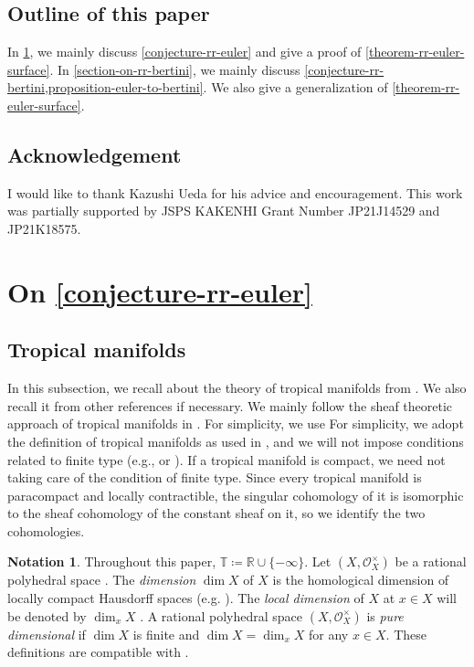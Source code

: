 \documentclass[a4paper,dvipdfmx,reqno,12pt]{amsart}
\theoremstyle{definition}
\newtheorem{notation}[theorem]{Notation}
\newcommand{\deq}{\coloneqq}
\numberwithin{equation}{section}
\begin{document}
\subsection{Outline of this paper}
In \cref{section-on-rr-euler}, we mainly
discuss \cref{conjecture-rr-euler} and
give a proof of \cref{theorem-rr-euler-surface}.
In \cref{section-on-rr-bertini}, we mainly
discuss \cref{conjecture-rr-bertini,proposition-euler-to-bertini}.
We also give a generalization of
\cref{theorem-rr-euler-surface}.

\subsection*{Acknowledgement}
I would like to thank Kazushi Ueda for his advice
and encouragement. This work was partially supported 
by JSPS KAKENHI Grant Number JP21J14529 and JP21K18575.

\section{On \cref{conjecture-rr-euler}}
\label{section-on-rr-euler}
\subsection{Tropical manifolds}
In this subsection, we recall about 
the theory of tropical manifolds from
\cite{shaw2011tropical,MR3330789,mikhalkin2018tropical,MR4637248,demedrano2023chern}.
We also recall it from other references if necessary.
We mainly follow the sheaf theoretic approach of
tropical manifolds in \cite{MR4637248}.
For simplicity, we use 
For simplicity, we adopt the definition of
tropical manifolds as used in \cite[Definition 6.1]{gross2019sheaftheoretic},
and we will not impose conditions related to finite type 
(e.g., \cite[Definition 7.1.14]{mikhalkin2018tropical} 
or \cite[Definition 2.3 (4)]{demedrano2023chern}).
If a tropical manifold is compact, we need not
taking care of the condition of finite type. 
Since every tropical manifold is paracompact and
locally contractible, the singular cohomology
of it is isomorphic to the sheaf cohomology
of the constant sheaf on it, so we identify
the two cohomologies.

\begin{notation}
Throughout this paper, $\mathbb{T}\deq 
\mathbb{R}\cup\{-\infty\}$.
Let $(X,\mathcal{O}_X^{\times})$ be a rational
polyhedral space \cite[Definition 2.2]{MR4246795}.
The \emph{dimension} $\dim X$ of $X$ is 
the homological dimension of locally compact
Hausdorff spaces (e.g.
\cite[Chapter III. Definition 9.4]{MR842190}).
The \emph{local dimension} of $X$ at $x\in X$
will be denoted by $\dim_x X$
\cite[Chapter III. Definition 9.10]{MR842190}.
A rational polyhedral space $(X,\mathcal{O}_X^{\times})$
is \emph{pure dimensional} if $\dim X$ is finite and
$\dim X=\dim_x X$ for any $x\in X$.
These definitions are compatible with
\cite[Definition 7.1.1]{mikhalkin2018tropical}.
\end{notation}
\end{document}
